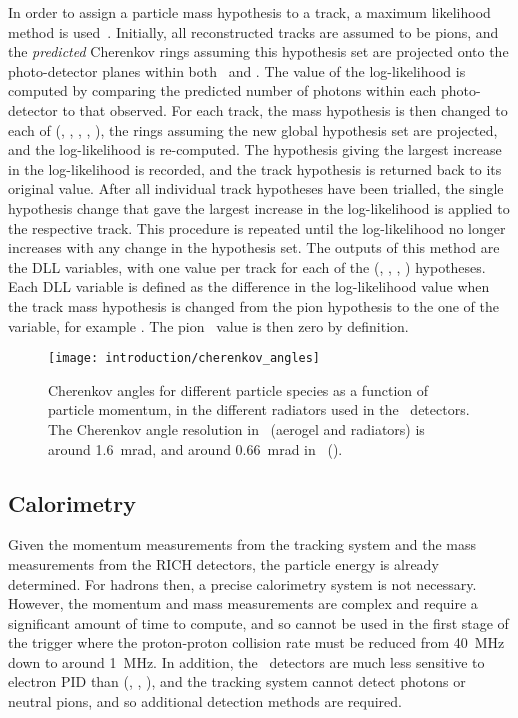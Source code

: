 In order to assign a particle mass hypothesis to a track, a maximum likelihood 
method is used~\cite{Forty:1998eqa}.
Initially, all reconstructed tracks are assumed to be pions, and the 
\emph{predicted} Cherenkov rings assuming this hypothesis set are projected 
onto the photo-detector planes within both \richone\ and \richtwo.
The value of the log-likelihood is computed by comparing the predicted number 
of photons within each photo-detector to that observed.
For each track, the mass hypothesis is then changed to each of (\Pe, \Pmu, 
\Ppi, \PK, \Pproton), the rings assuming the new global hypothesis set are 
projected, and the log-likelihood is re-computed.
The hypothesis giving the largest increase in the log-likelihood is recorded, 
and the track hypothesis is returned back to its original value.
After all individual track hypotheses have been trialled, the single hypothesis 
change that gave the largest increase in the log-likelihood is applied to the 
respective track.
This procedure is repeated until the log-likelihood no longer increases with 
any change in the hypothesis set.
The outputs of this method are the \ac{DLL} variables, with one value per track 
for each of the (\Pe, \Pmu, \PK, \Pproton) hypotheses.
Each \ac{DLL} variable is defined as the difference in the log-likelihood value 
when the track mass hypothesis is changed from the pion hypothesis to the one 
of the variable, for example \dllkpi.
The pion \dll\ value is then zero by definition.

\begin{figure}
  \centering
  \texttt{[image: introduction/cherenkov\_angles]}
  \caption{%
    Cherenkov angles for different particle species as a function of particle 
    momentum, in the different radiators used in the \rich\ detectors.
    The Cherenkov angle resolution in \richone~(aerogel and  
    radiators) is around \SI{1.6}{\milli\radian}, and around 
    \SI{0.66}{\milli\radian} in \richtwo~().
  }
  \label{fig:intro:lhcb:cherenkov_angles}
\end{figure}

\subsection{Calorimetry}
\label{chap:intro:lhcb:detector:calo}

Given the momentum measurements from the tracking system and the mass 
measurements from the \ac{RICH} detectors, the particle energy is already 
determined.
For hadrons then, a precise calorimetry system is not necessary.
However, the momentum and mass measurements are complex and require a 
significant amount of time to compute, and so cannot be used in the first stage 
of the trigger where the proton-proton collision rate must be reduced from 
\SI{40}{\mega\hertz} down to around \SI{1}{\mega\hertz}.
In addition, the \rich\ detectors are much less sensitive to electron \ac{PID} 
than (\Ppi, \PK, \Pproton), and the tracking system cannot detect photons or 
neutral pions, and so additional detection methods are required.

